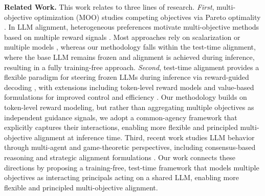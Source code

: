 \documentclass{article}
\begin{document}
\textbf{Related Work.}
This work relates to three lines of research. 
\textit{First}, multi-objective optimization (MOO) studies competing objectives via Pareto optimality \citep{ye2021multi}. In LLM alignment, heterogeneous preferences motivate multi-objective methods based on multiple reward signals \citep{yang2024rewards,lin2025parm,li2025gradient,zhou2024beyond}. Most approaches rely on scalarization or multiple models \citep{li2020deep,wu2023fine,rame2023rewarded,jang2023consistency}, whereas our methodology falls within the test-time alignment, where the base LLM remains frozen and alignment is achieved during inference, resulting in a fully training-free approach.
\textit{Second}, test-time alignment provides a flexible paradigm for steering frozen LLMs during inference via reward-guided decoding \citep{khanovargs,huang2025deal}, with extensions including token-level reward models and value-based formulations for improved control and efficiency \citep{xu2024genarm,shi2024decoding,lin2025parm,xie2026uniarm,mudgal2024controlled,chakraborty2024transfer}. Our methodology builds on token-level reward modeling, but rather than aggregating multiple objectives as independent guidance signals, we adopt a common-agency framework that explicitly captures their interactions, enabling more flexible and principled multi-objective alignment at inference time. 
Third, recent work studies LLM behavior through multi-agent and game-theoretic perspectives, including consensus-based reasoning and strategic alignment formulations \citep{huang2024ensemble,chenincentivizing,chen2026survey,cheng2024self,kirchner2024prover,jacob2023consensus,zhu2026align,makar2024sta,chu2025stackelberg,sun2024mechanism,bueningstrategyproof}. 
Our work connects these directions by proposing a training-free, test-time framework that models multiple objectives as interacting principals acting on a shared LLM, enabling more flexible and principled multi-objective alignment. 

\end{document}
